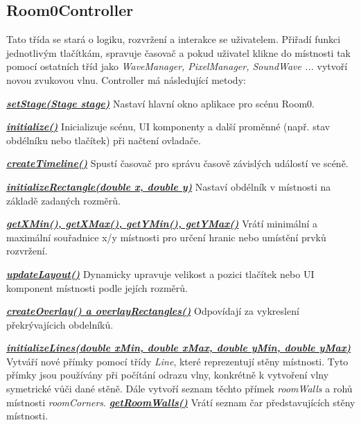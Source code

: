 \subsection{Room0Controller}
Tato třída se stará o logiku, rozvržení a  interakce se uživatelem. Přiřadí funkci jednotlivým tlačítkám, spravuje časovač a pokud uživatel klikne do místnosti tak pomocí ostatních tříd jako \textit{WaveManager, PixelManager, SoundWave ...} vytvoří novou zvukovou vlnu. Controller má následující metody:

\vspace{0.3cm}  
\underline{\textbf{\textit{setStage(Stage stage)}}} \newline
Nastaví hlavní okno aplikace pro scénu Room0.

\vspace{0.3cm}  
\underline{\textbf{\textit{initialize()}}} \newline 
Inicializuje scénu, UI komponenty a další proměnné (např. stav obdélníku nebo tlačítek) při načtení ovladače.

\vspace{0.3cm}  
\underline{\textbf{\textit{createTimeline()}}}  \newline
Spustí časovač pro správu časově závislých událostí ve scéně.

\vspace{0.3cm}  
\underline{\textbf{\textit{initializeRectangle(double x, double y)}}}  \newline
Nastaví obdélník v místnosti na základě zadaných rozměrů.

\vspace{0.3cm}  
\underline{\textbf{\textit{getXMin(), getXMax(), getYMin(), getYMax()}}}  \newline
Vrátí minimální a maximální souřadnice x/y místnosti pro určení hranic nebo umístění prvků rozvržení.

\vspace{0.3cm}  
\underline{\textbf{\textit{updateLayout()}}}  \newline
Dynamicky upravuje velikost a pozici tlačítek nebo UI komponent místnosti podle jejích rozměrů.

\vspace{0.3cm}  
\underline{\textbf{\textit{createOverlay() a overlayRectangles()}}}  \newline
Odpovídají za vykreslení překrývajícich obdelníků.

\vspace{0.3cm}  
\underline{\textbf{\textit{initializeLines(double xMin, double xMax, double yMin, double yMax)}}}\\
Vytváří nové přímky pomocí třídy \textit{Line}, které reprezentují stěny místnosti. Tyto přímky jsou používány při počítání odrazu vlny, konkrétně k vytvoření vlny symetrické vůči dané stěně. Dále vytvoří seznam těchto přímek \textit{roomWalls} a rohů místnosti \textit{roomCorners}. 
\newpage 
\underline{\textbf{\textit{getRoomWalls()}}}  \newline
Vrátí seznam čar představujících stěny místnosti.

